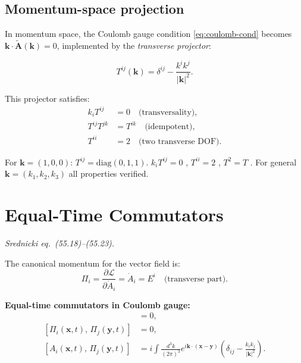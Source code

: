 \subsection{Momentum-space projection}

In momentum space, the Coulomb gauge condition \eqref{eq:coulomb-cond} becomes
$\mathbf{k}\cdot\tilde{\mathbf{A}}(\mathbf{k}) = 0$, implemented by the
\emph{transverse projector}:

\begin{mdframed}[backgroundcolor=blue!5]
\begin{equation}\label{eq:transverse-projector}
  T^{ij}(\mathbf{k}) = \delta^{ij} - \frac{k^i k^j}{|\mathbf{k}|^2}.
\end{equation}
\end{mdframed}

This projector satisfies:
\begin{align}
  k_i T^{ij} &= 0 \quad\text{(transversality)}, \\
  T^{ij}T^{jk} &= T^{ik} \quad\text{(idempotent)}, \\
  T^{ii} &= 2 \quad\text{(two transverse DOF)}.
\end{align}

\begin{mdframed}[backgroundcolor=green!5]
 For $\mathbf{k}=(1,0,0)$: $T^{ij} = \mathrm{diag}(0,1,1)$.
$k_i T^{ij}=0$ \checkmark, $T^{ii}=2$ \checkmark, $T^2=T$ \checkmark.
For general $\mathbf{k}=(k_1,k_2,k_3)$ all properties verified. \checkmark
\end{mdframed}

\section{Equal-Time Commutators}

\textit{Srednicki eq.\ (55.18)--(55.23).}

The canonical momentum for the vector field is:
\begin{equation}
  \Pi_i = \frac{\partial\mathcal{L}}{\partial\dot A_i} = \dot A_i = E^i \quad
  \text{(transverse part)}.
\end{equation}

\begin{mdframed}[backgroundcolor=blue!5]
\textbf{Equal-time commutators in Coulomb gauge:}
\begin{align}
  [A_i(\mathbf{x},t),\, A_j(\mathbf{y},t)] &= 0, \label{eq:comm-AA}\\
  [\Pi_i(\mathbf{x},t),\, \Pi_j(\mathbf{y},t)] &= 0, \label{eq:comm-PP}\\
  [A_i(\mathbf{x},t),\, \Pi_j(\mathbf{y},t)] &= i\int\!\frac{d^3k}{(2\pi)^3}
  e^{i\mathbf{k}\cdot(\mathbf{x}-\mathbf{y})}
  \left(\delta_{ij} - \frac{k_ik_j}{|\mathbf{k}|^2}\right). \label{eq:comm-AP}
\end{align}
\end{mdframed}

